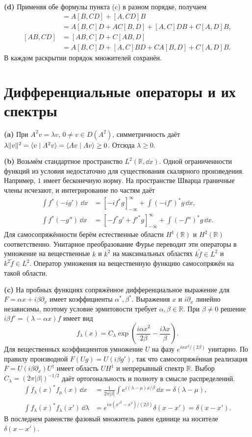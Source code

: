 \documentclass[11pt,a4paper]{article}
\begin{document}
\textbf{(d)} Применяя обе формулы пункта (c) в разном порядке, получаем
\begin{align*}
 [AB,CD]&=A[B,CD]+[A,CD]B\\
        &=A[B,C]D+AC[B,D]+[A,C]DB+C[A,D]B,\\
 [AB,CD]&=[AB,C]D+C[AB,D]\\
        &=A[B,C]D+[A,C]BD+CA[B,D]+C[A,D]B .
\end{align*}
В каждом раскрытии порядок множителей сохранён.

\section{Дифференциальные операторы и их спектры}

\textbf{(a)} При \(A^2v=\lambda v\), \(0\ne v\in D(A^2)\), симметричность
даёт \(\lambda\|v\|^2=\langle v\mid A^2v\rangle=\langle Av\mid Av\rangle\ge0\).
Отсюда \(\lambda\ge0\).

\textbf{(b)} Возьмём стандартное пространство \(L^2(\mathbb R,\dd x)\).
Одной ограниченности функций из условия недостаточно для существования
скалярного произведения. Например, \(1\) имеет бесконечную норму.
На пространстве Шварца граничные члены исчезают, и интегрирование по
частям даёт
\begin{align*}
 \int f^*(-ig')\,\dd x
   &=[-if^*g]_{-\infty}^{\infty}+\int ( -if')^*g\,\dd x,\\
 \int f^*(-g'')\,\dd x
   &=[-f^*g'+f'^*g]_{-\infty}^{\infty}+\int(-f'')^*g\,\dd x.
\end{align*}
Для самосопряжённости берём естественные области \(H^1(\mathbb R)\) и
\(H^2(\mathbb R)\) соответственно. Унитарное преобразование Фурье
переводит эти операторы в умножение на вещественные \(k\) и \(k^2\)
на максимальных областях \(k\tilde f\in L^2\) и \(k^2\tilde f\in L^2\).
Оператор умножения на вещественную функцию самосопряжён на такой области.

\textbf{(c)} На пробных функциях сопряжённое дифференциальное выражение
для \(F=\alpha x+i\beta\partial_x\) имеет коэффициенты
\(\alpha^*,\beta^*\). Выражения \(x\) и \(i\partial_x\) линейно
независимы, поэтому условие эрмитовости требует
\(\alpha,\beta\in\mathbb R\).
При \(\beta\ne0\) решение \(i\beta f'=(\lambda-\alpha x)f\) имеет вид
\[
 f_\lambda(x)=C_\lambda
 \exp\!\left(\frac{i\alpha x^2}{2\beta}-\frac{i\lambda x}{\beta}\right).
\]
Для вещественных коэффициентов умножение \(U\) на фазу
\(e^{i\alpha x^2/(2\beta)}\) унитарно. По правилу производной
\(F(Ug)=U(i\beta g')\), так что самосопряжённая реализация
\(F=U(i\beta\partial_x)U^\dagger\) имеет область \(UH^1\)
и непрерывный спектр \(\mathbb R\). Выбор \(C_\lambda=(2\pi|\beta|)^{-1/2}\)
даёт ортогональность и полноту в смысле распределений.
\begin{align*}
 \int f_\lambda(x)^*f_\mu(x)\,\dd x
  &=\frac{1}{2\pi|\beta|}\int e^{i(\lambda-\mu)x/\beta}\,\dd x
    =\delta(\lambda-\mu),\\
 \int f_\lambda(x)^* f_\lambda(x')\,\dd\lambda
  &=e^{i\alpha(x'^2-x^2)/(2\beta)}\delta(x-x')=\delta(x-x').
\end{align*}
В последнем равенстве фазовый множитель равен единице на носителе
\(\delta(x-x')\).
\end{document}
